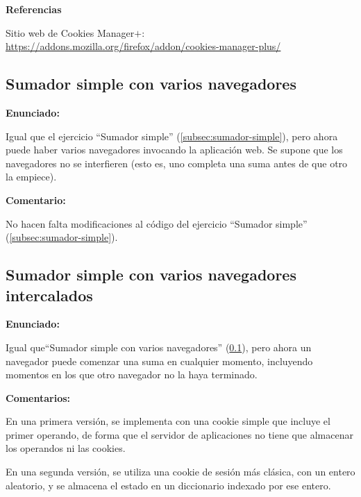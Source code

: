 \textbf{Referencias}

Sitio web de Cookies Manager$+$: \url{https://addons.mozilla.org/firefox/addon/cookies-manager-plus/}


\subsection{Sumador simple con varios navegadores}
\label{subsec:sumador-simple-varios}

\textbf{Enunciado:}

Igual que el ejercicio ``Sumador simple'' (\ref{subsec:sumador-simple}), pero ahora puede haber varios navegadores invocando la aplicación web. Se supone que los navegadores no se interfieren (esto es, uno completa una suma antes de que otro la empiece).

\textbf{Comentario:}

No hacen falta modificaciones al código del ejercicio ``Sumador simple'' (\ref{subsec:sumador-simple}).


\subsection{Sumador simple con varios navegadores intercalados}
\label{subsec:sumador-simple-varios-intercalados}

\textbf{Enunciado:}

Igual que``Sumador simple con varios navegadores'' (\ref{subsec:sumador-simple-varios}), pero ahora un navegador puede comenzar una suma en cualquier momento, incluyendo momentos en los que otro navegador no la haya terminado.

\textbf{Comentarios:}

En una primera versión, se implementa con una cookie simple que incluye el primer operando, de forma que el servidor de aplicaciones no tiene que almacenar los operandos ni las cookies.

En una segunda versión, se utiliza una cookie de sesión más clásica, con un entero aleatorio, y se almacena el estado en un diccionario indexado por ese entero.


